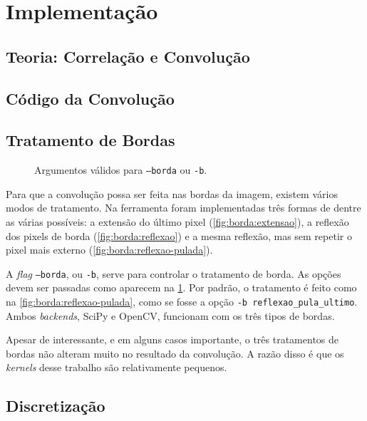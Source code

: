 \section{Implementação} \label{sec:impl}

\subsection{Teoria: Correlação e Convolução}

    

\subsection{Código da Convolução}

    

\subsection{Tratamento de Bordas}

    \begin{figure}[H]
        \centering
        

        \caption{Argumentos válidos para \texttt{--borda} ou \texttt{-b}.}
        \label{fig:borda}
    \end{figure}

    Para que a convolução possa ser feita nas bordas da imagem, existem vários modos de tratamento. Na ferramenta foram implementadas três formas de dentre as várias possíveis: a extensão do último pixel (\ref{fig:borda:extensao}), a reflexão dos pixels de borda (\ref{fig:borda:reflexao}) e a mesma reflexão, mas sem repetir o pixel mais externo (\ref{fig:borda:reflexao-pulada}).

    A \textit{flag} \texttt{--borda}, ou \texttt{-b}, serve para controlar o tratamento de borda. As opções devem ser passadas como aparecem na \cref{fig:borda}. Por padrão, o tratamento é feito como na \cref{fig:borda:reflexao-pulada}, como se fosse a opção \texttt{-b reflexao_pula_ultimo}. Ambos \textit{backends}, SciPy e OpenCV, funcionam com os três tipos de bordas.

    Apesar de interessante, e em alguns casos importante, o três tratamentos de bordas não alteram muito no resultado da convolução. A razão disso é que os \textit{kernels} desse trabalho são relativamente pequenos.

\subsection{Discretização}

